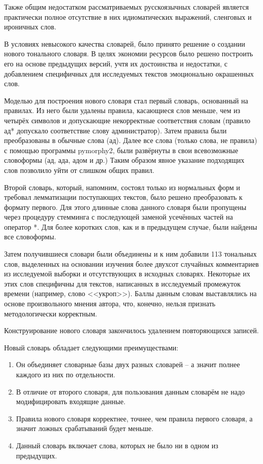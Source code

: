 Также общим недостатком рассматриваемых русскоязычных словарей является практически полное отсутствие в них идиоматических выражений, сленговых и ироничных слов.

В условиях невысокого качества словарей, было принято решение о создании нового тонального словаря. В целях экономии ресурсов было решено построить его на основе предыдущих версий, учтя их достоинства и недостатки, с добавлением специфичных для исследуемых текстов эмоционально окрашенных слов.

Моделью для построения нового словаря стал первый словарь, основанный на правилах. Из него были удалены правила, касающиеся слов меньше, чем из четырёх символов и допускающие некорректные соответствия словам (правило ад* допускало соответствие слову администратор). Затем правила были преобразованы в обычные слова (ад). Далее все слова (только слова, не правила) с помощью программы pymorphy2, были развёрнуты в свои всевозможные словоформы (ад, ада, адом и др.) Таким образом явное указание подходящих слов позволило уйти от слишком общих правил.

Второй словарь, который, напомним, состоял только из нормальных форм и требовал лемматизации поступающих текстов, было решено преобразовать к формату первого. Для этого длинные слова данного словаря были пропущены через процедуру стемминга с последующей заменой усечённых частей на оператор *. Для более коротких слов, как и в предыдущем случае, были найдены все словоформы.

Затем получившиеся словари были объединены и к ним добавили 113 тональных слов, выделенных на основании изучения более двухсот случайных комментариев из исследуемой выборки и отсутствующих в исходных словарях. Некоторые их этих слов специфичны для текстов, написанных в исследуемый промежуток времени (например, слово <<укроп>>). Баллы данным словам выставлялись на основе произвольного мнения автора, что, конечно, нельзя признать методологически корректным.

Конструирование нового словаря закончилось удалением повторяющихся записей.

Новый словарь обладает следующими преимуществами:

\begin{enumerate}
\item Он объединяет словарные базы двух разных словарей -- а значит полнее каждого из них по отдельности.
\item В отличие от второго словаря, для пользования данным словарём не надо модифицировать входящие данные.
\item Правила нового словаря корректнее, точнее, чем правила первого словаря, а значит ложных срабатываний будет меньше.
\item Данный словарь включает слова, которых не было ни в одном из предыдущих.
\end{enumerate}

